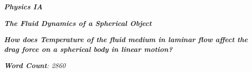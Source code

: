 

\begin{titlepage}
    \begin{center}
        \vspace*{1cm}
            
        \date{}
            
        \huge
            
        \textit{\textbf{Physics IA}}
            
        \vspace{0.25cm}
            
        \hline
            
        \vspace{2.5cm}
            
        \textit{\textbf{The Fluid Dynamics of a Spherical Object}}
            
        \vspace{2.5cm}
            
        \LARGE
            
        \textit{\textbf{How does Temperature of the fluid medium in laminar flow affect the drag force on a spherical body in linear motion? }}
            
        \vspace{2.5cm}
            
        \Large
            
        \vspace{0.25cm}
        

		\vspace{1cm}            
            
		\Large		
		        
		\vspace{0.25cm} 
		
		\textit{\textbf{Word Count}: 2860}		
		   
            
        \vspace{2cm}
            
        \Large
         
		\vspace{0.25cm}         
            
            
        \vspace{0.25cm}
            
        \hline
           
            
    \end{center}
\end{titlepage}



